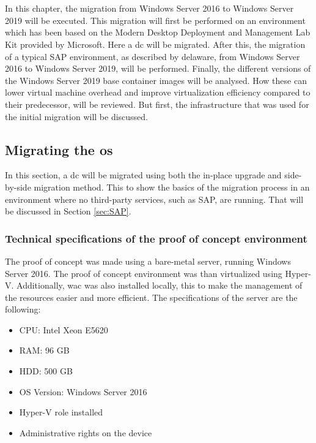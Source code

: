 \chapter{}
\label{ch:methodologie}
In this chapter, the migration from Windows Server 2016 to Windows Server 2019 will be executed. 
This migration will first be performed on an environment which has been based on the Modern Desktop Deployment and Management Lab Kit provided by Microsoft. \autocite{Gallagher2018} 
Here a \acrfull{dc} will be migrated. 
After this, the migration of a typical SAP environment, as described by delaware, from Windows Server 2016 to Windows Server 2019, will be performed. 
Finally, the different versions of the Windows Server 2019 base container images will be analysed. 
How these can lower virtual machine overhead and improve virtualization efficiency compared to their predecessor, will be reviewed. 
But first, the infrastructure that was used for the initial migration will be discussed.

\section{Migrating the \acrshort{os}}
\label{sec:Migrating_the_OS}
In this section, a \acrshort{dc} will be migrated using both the in-place upgrade and side-by-side migration method. 
This to show the basics of the migration process in an environment where no third-party services, such as SAP, are running. 
That will be discussed in Section \ref{sec:SAP}.

\subsection{Technical specifications of the proof of concept environment}
The proof of concept was made using a bare-metal server, running Windows Server 2016. 
The proof of concept environment was than virtualized using Hyper-V. 
Additionally, \acrlong{wac} was also installed locally, this to make the management of the resources easier and more efficient.
The specifications of the server are the following:

\begin{itemize}
	\item CPU: Intel Xeon E5620
	\item RAM: 96 GB 
	\item HDD: 500 GB
	\item OS Version: Windows Server 2016
	\item Hyper-V role installed
	\item Administrative rights on the device
\end{itemize}

